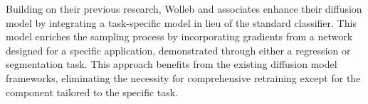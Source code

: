 Building on their previous research, Wolleb and associates \cite{Wolleb2022MultiTask} enhance their diffusion model by integrating a task-specific model in lieu of the standard classifier. This model enriches the sampling process by incorporating gradients from a network designed for a specific application, demonstrated through either a regression or segmentation task. This approach benefits from the existing diffusion model frameworks, eliminating the necessity for comprehensive retraining except for the component tailored to the specific task.
